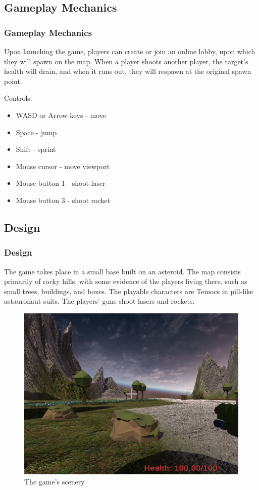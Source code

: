 \documentclass{beamer}
\begin{document}
\subsection{Gameplay Mechanics}

\begin{frame}
\frametitle{Gameplay Mechanics}
Upon launching the game, players can create or join an online lobby, upon which they will spawn on the map. When a player shoots another player, the target's health will drain, and when it runs out, they will respawn at the original spawn point.

Controls:

    \begin{itemize}
        \item WASD or Arrow keys - move
        \item Space - jump
        \item Shift - sprint
        \item Mouse cursor - move viewport
        \item Mouse button 1 - shoot laser
        \item Mouse button 3 - shoot rocket
    \end{itemize}

\end{frame}

\subsection{Design}

\begin{frame}
\frametitle{Design}
The game takes place in a small base built on an asteroid. The map consists primarily of rocky hills, with some evidence of the players living there, such as small trees, buildings, and boxes. The playable characters are Temocs in pill-like astauronaut suits. The players' guns shoot lasers and rockets.

    \begin{figure}
        \includegraphics[height=0.5\textheight,keepaspectratio]{scenery}
        \caption{The game's scenery}
    \end{figure}

\end{frame}
\end{document}
